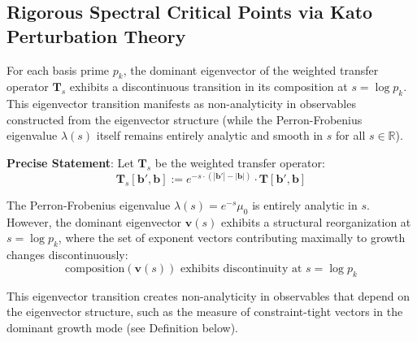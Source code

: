 \subsection{Rigorous Spectral Critical Points via Kato Perturbation Theory}
\label{subsec:kato-perturbation-rigorous}


\begin{theorem}
\label{thm:kato-spectral-critical-points}

For each basis prime $p_k$, the dominant eigenvector of the weighted transfer operator $\mathbf{T}_s$ exhibits a discontinuous transition in its composition at $s = \log p_k$. This eigenvector transition manifests as non-analyticity in observables constructed from the eigenvector structure (while the Perron-Frobenius eigenvalue $\lambda(s)$ itself remains entirely analytic and smooth in $s$ for all $s \in \mathbb{R}$).

\noindent \textbf{Precise Statement}: Let $\mathbf{T}_s$ be the weighted transfer operator:
\begin{equation}
\mathbf{T}_s[\mathbf{b}', \mathbf{b}] := e^{-s \cdot (|\mathbf{b}'| - |\mathbf{b}|)} \cdot \mathbf{T}[\mathbf{b}', \mathbf{b}]
\end{equation}

The Perron-Frobenius eigenvalue $\lambda(s) = e^{-s} \mu_0$ is entirely analytic in $s$. However, the dominant eigenvector $\mathbf{v}(s)$ exhibits a structural reorganization at $s = \log p_k$, where the set of exponent vectors contributing maximally to growth changes discontinuously:
\begin{equation}
\text{composition}(\mathbf{v}(s)) \text{ exhibits discontinuity at } s = \log p_k
\end{equation}

This eigenvector transition creates non-analyticity in observables that depend on the eigenvector structure, such as the measure of constraint-tight vectors in the dominant growth mode (see Definition below).

\end{theorem}


